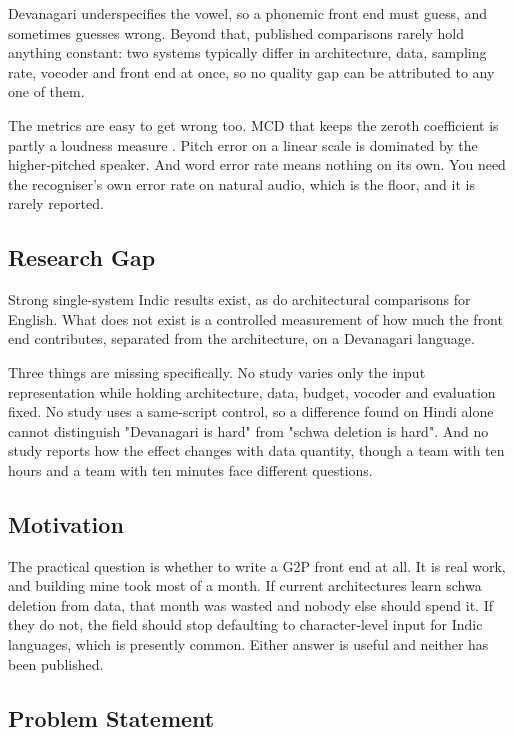 \documentclass[12pt,a4paper]{article}
\begin{document}
Devanagari underspecifies the vowel, so a phonemic front end must guess, and
sometimes guesses wrong. Beyond that, published comparisons rarely hold
anything constant: two systems typically differ in architecture, data, sampling
rate, vocoder and front end at once, so no quality gap can be attributed to any
one of them.

The metrics are easy to get wrong too. MCD that keeps the zeroth coefficient
is partly a loudness measure \cite{kubichek1993mcd}. Pitch error on a linear
scale is dominated by the higher-pitched speaker. And word error rate means
nothing on its own. You need the recogniser's own error rate on natural audio,
which is the floor, and it is rarely reported.

\subsection{Research Gap}

Strong single-system Indic results exist, as do architectural comparisons for
English. What does not exist is a controlled measurement of how much the front
end contributes, separated from the architecture, on a Devanagari language.

Three things are missing specifically. No study varies only the input
representation while holding architecture, data, budget, vocoder and evaluation
fixed. No study uses a same-script control, so a difference found on Hindi
alone cannot distinguish "Devanagari is hard" from "schwa deletion is hard".
And no study reports how the effect changes with data quantity, though a team
with ten hours and a team with ten minutes face different questions.

\subsection{Motivation}

The practical question is whether to write a G2P front end at all. It is real
work, and building mine took most of a month. If
current architectures learn schwa deletion from data, that month was wasted and
nobody else should spend it. If they do not, the field should stop defaulting
to character-level input for Indic languages, which is presently common. Either
answer is useful and neither has been published.

\subsection{Problem Statement}
\end{document}
